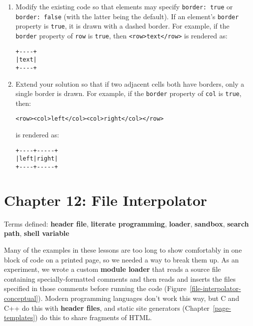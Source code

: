 \documentclass[krantzl]{krantz}
\newcommand{\chapref}[1]{Chapter~\ref{#1}}
\newcommand{\figref}[1]{Figure~\ref{#1}}
\newcommand{\glossref}[1]{\textbf{#1}}
\begin{document}
\begin{enumerate}

\item 

Modify the existing code so that elements may specify \texttt{border: true} or \texttt{border: false}
    (with the latter being the default).
    If an element's \texttt{border} property is \texttt{true},
    it is drawn with a dashed border.
    For example,
    if the \texttt{border} property of \texttt{row} is \texttt{true},
    then \texttt{<row>text</row>} is rendered as:

\begin{lstlisting}[frame=single,frameround=tttt]
+----+
|text|
+----+
\end{lstlisting}



\item 

Extend your solution so that if two adjacent cells both have borders,
    only a single border is drawn.
    For example,
    if the \texttt{border} property of \texttt{col} is \texttt{true},
    then:

\begin{lstlisting}[frame=single,frameround=tttt]
<row><col>left</col><col>right</col></row>
\end{lstlisting}


\noindent is rendered as:

\begin{lstlisting}[frame=single,frameround=tttt]
+----+-----+
|left|right|
+----+-----+
\end{lstlisting}



\end{enumerate}

\chapter{Chapter 12: File Interpolator}\label{file-interpolator}


\noindent 
    Terms defined:
    \glossref{header file}, \glossref{literate programming}, \glossref{loader}, \glossref{sandbox}, \glossref{search path}, \glossref{shell variable}



Many of the examples in these lessons are too long
to show comfortably in one block of code on a printed page,
so we needed a way to break them up.
As an experiment,
we wrote a custom \glossref{module loader}
that reads a source file containing specially-formatted comments
and then reads and inserts the files specified in those comments
before running the code
(\figref{file-interpolator-conceptual}).
Modern programming languages don't work this way,
but C and C++ do this
with \glossref{header files},
and static site generators
(\chapref{page-templates}) do this to share fragments of HTML.
\end{document}
